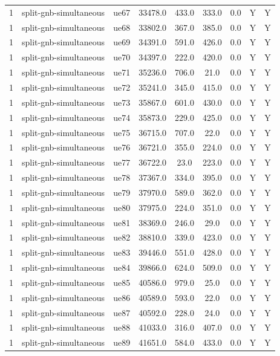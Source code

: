 \begin{table}[ht]
\begin{tabular}{|c|c|c|c|c|c|c|c|c|}
1 & split-gnb-simultaneous & ue67 & 33478.0 & 433.0 & 333.0 & 0.0 & Y & Y \\
1 & split-gnb-simultaneous & ue68 & 33802.0 & 367.0 & 385.0 & 0.0 & Y & Y \\
1 & split-gnb-simultaneous & ue69 & 34391.0 & 591.0 & 426.0 & 0.0 & Y & Y \\
1 & split-gnb-simultaneous & ue70 & 34397.0 & 222.0 & 420.0 & 0.0 & Y & Y \\
1 & split-gnb-simultaneous & ue71 & 35236.0 & 706.0 & 21.0 & 0.0 & Y & Y \\
1 & split-gnb-simultaneous & ue72 & 35241.0 & 345.0 & 415.0 & 0.0 & Y & Y \\
1 & split-gnb-simultaneous & ue73 & 35867.0 & 601.0 & 430.0 & 0.0 & Y & Y \\
1 & split-gnb-simultaneous & ue74 & 35873.0 & 229.0 & 425.0 & 0.0 & Y & Y \\
1 & split-gnb-simultaneous & ue75 & 36715.0 & 707.0 & 22.0 & 0.0 & Y & Y \\
1 & split-gnb-simultaneous & ue76 & 36721.0 & 355.0 & 224.0 & 0.0 & Y & Y \\
1 & split-gnb-simultaneous & ue77 & 36722.0 & 23.0 & 223.0 & 0.0 & Y & Y \\
1 & split-gnb-simultaneous & ue78 & 37367.0 & 334.0 & 395.0 & 0.0 & Y & Y \\
1 & split-gnb-simultaneous & ue79 & 37970.0 & 589.0 & 362.0 & 0.0 & Y & Y \\
1 & split-gnb-simultaneous & ue80 & 37975.0 & 224.0 & 351.0 & 0.0 & Y & Y \\
1 & split-gnb-simultaneous & ue81 & 38369.0 & 246.0 & 29.0 & 0.0 & Y & Y \\
1 & split-gnb-simultaneous & ue82 & 38810.0 & 339.0 & 423.0 & 0.0 & Y & Y \\
1 & split-gnb-simultaneous & ue83 & 39446.0 & 551.0 & 428.0 & 0.0 & Y & Y \\
1 & split-gnb-simultaneous & ue84 & 39866.0 & 624.0 & 509.0 & 0.0 & Y & Y \\
1 & split-gnb-simultaneous & ue85 & 40586.0 & 979.0 & 25.0 & 0.0 & Y & Y \\
1 & split-gnb-simultaneous & ue86 & 40589.0 & 593.0 & 22.0 & 0.0 & Y & Y \\
1 & split-gnb-simultaneous & ue87 & 40592.0 & 228.0 & 24.0 & 0.0 & Y & Y \\
1 & split-gnb-simultaneous & ue88 & 41033.0 & 316.0 & 407.0 & 0.0 & Y & Y \\
1 & split-gnb-simultaneous & ue89 & 41651.0 & 584.0 & 433.0 & 0.0 & Y & Y \\

\end{tabular}
\end{table}
